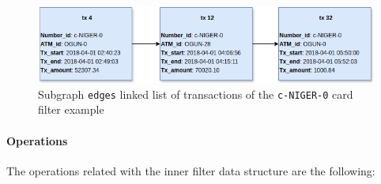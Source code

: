 \begin{figure}[H]
    \centering
    \includegraphics[scale = 0.45]{images/3-Engine/subgraph.png}
    \caption{Subgraph \texttt{edges} linked list of transactions of the \texttt{c-NIGER-0} card filter example}
    \label{img:pipeline-subgraph}
\end{figure}

\paragraph{Operations}
The operations related with the inner filter data structure are the following:

